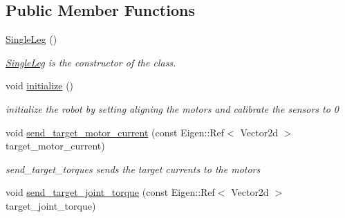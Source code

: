 \subsection*{Public Member Functions}
\begin{DoxyCompactItemize}
\item 
\hyperlink{classblmc__robots_1_1SingleLeg_a1b1ef6964010aa2042b042ff3d5d864f}{Single\+Leg} ()
\begin{DoxyCompactList}\small\item\em \hyperlink{classblmc__robots_1_1SingleLeg}{Single\+Leg} is the constructor of the class. \end{DoxyCompactList}\item 
void \hyperlink{classblmc__robots_1_1SingleLeg_a28891a4273cdcabc67bfd04dae75e8db}{initialize} ()\hypertarget{classblmc__robots_1_1SingleLeg_a28891a4273cdcabc67bfd04dae75e8db}{}\label{classblmc__robots_1_1SingleLeg_a28891a4273cdcabc67bfd04dae75e8db}

\begin{DoxyCompactList}\small\item\em initialize the robot by setting aligning the motors and calibrate the sensors to 0 \end{DoxyCompactList}\item 
void \hyperlink{classblmc__robots_1_1SingleLeg_ac68163f459be877af9fb78f348729f9b}{send\+\_\+target\+\_\+motor\+\_\+current} (const Eigen\+::\+Ref$<$ Vector2d $>$ target\+\_\+motor\+\_\+current)\hypertarget{classblmc__robots_1_1SingleLeg_ac68163f459be877af9fb78f348729f9b}{}\label{classblmc__robots_1_1SingleLeg_ac68163f459be877af9fb78f348729f9b}

\begin{DoxyCompactList}\small\item\em send\+\_\+target\+\_\+torques sends the target currents to the motors \end{DoxyCompactList}\item 
void \hyperlink{classblmc__robots_1_1SingleLeg_a0525a29e9b76527936525ca0e47cafe0}{send\+\_\+target\+\_\+joint\+\_\+torque} (const Eigen\+::\+Ref$<$ Vector2d $>$ target\+\_\+joint\+\_\+torque)\hypertarget{classblmc__robots_1_1SingleLeg_a0525a29e9b76527936525ca0e47cafe0}{}\label{classblmc__robots_1_1SingleLeg_a0525a29e9b76527936525ca0e47cafe0}


\end{DoxyCompactItemize}
